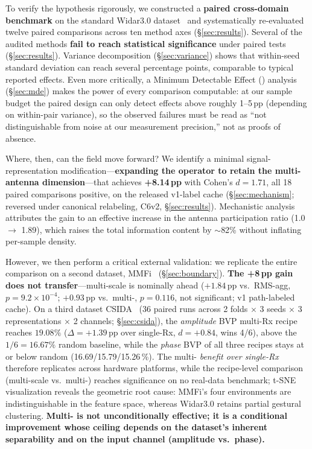 \documentclass[journal,11pt]{IEEEtran}
\newcommand{\BVP}{\text{BVP}}
\newcommand{\MDE}{\text{MDE}}
\newcommand{\Rx}{\text{Rx}}
\begin{document}
To verify the hypothesis rigorously, we constructed a \textbf{paired cross-domain benchmark} on the standard Widar3.0 dataset~\cite{zheng2019widar} and systematically re-evaluated twelve paired comparisons across ten method axes (\S\ref{sec:results}). Several of the audited methods \textbf{fail to reach statistical significance} under paired tests (\S\ref{sec:results}). Variance decomposition (\S\ref{sec:variance}) shows that within-seed standard deviation can reach several percentage points, comparable to typical reported effects. Even more critically, a Minimum Detectable Effect (\MDE) analysis (\S\ref{sec:mde}) makes the power of every comparison computable: at our sample budget the paired design can only detect effects above roughly 1--5\,pp (depending on within-pair variance), so the observed failures must be read as ``not distinguishable from noise at our measurement precision,'' not as proofs of absence.

Where, then, can the field move forward? We identify a minimal signal-representation modification---\textbf{expanding the \BVP{} operator to retain the multi-\Rx{} antenna dimension}---that achieves \textbf{+8.14\,pp} with Cohen's $d = 1.71$, all 18 paired comparisons positive, on the released v1-label cache (\S\ref{sec:mechanism}; reversed under canonical relabeling, C6v2, \S\ref{sec:results}). Mechanistic analysis attributes the gain to an effective increase in the antenna participation ratio (1.0 $\to$ 1.89), which raises the total information content by $\sim$82\% without inflating per-sample density.

However, we then perform a critical external validation: we replicate the entire comparison on a second dataset, MMFi~\cite{yang2023mmfi} (\S\ref{sec:boundary}). \textbf{The +8\,pp gain does not transfer}---multi-scale is nominally ahead ($+1.84$\,pp vs.\ RMS-agg, $p = 9.2\times10^{-4}$; $+0.93$\,pp vs.\ multi-\Rx, $p = 0.116$, not significant; v1 path-labeled cache). On a third dataset CSIDA~\cite{csida2022} (36 paired runs across 2 folds $\times$ 3 seeds $\times$ 3 representations $\times$ 2 channels; \S\ref{sec:csida}), the \emph{amplitude} BVP multi-Rx recipe reaches $19.08\%$ ($\Delta = +1.39$\,pp over single-Rx, $d = +0.84$, wins 4/6), above the $1/6 = 16.67\%$ random baseline, while the \emph{phase} BVP of all three recipes stays at or below random (16.69/15.79/15.26\,\%). The multi-\Rx{} \emph{benefit over single-Rx} therefore replicates across hardware platforms, while the recipe-level comparison (multi-scale vs.\ multi-\Rx) reaches significance on no real-data benchmark; t-SNE visualization reveals the geometric root cause: MMFi's four environments are indistinguishable in the \BVP{} feature space, whereas Widar3.0 retains partial gestural clustering. \textbf{Multi-\Rx{} is not unconditionally effective; it is a conditional improvement whose ceiling depends on the dataset's inherent separability and on the input channel (amplitude vs.\ phase).}
\end{document}
